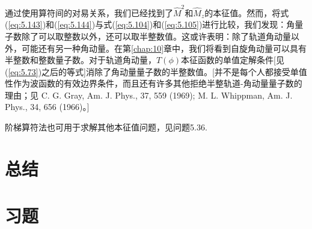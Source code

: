     通过使用算符间的对易关系，我们已经找到了$\hat{M}^2$和$\hat{M}_z$的本征值。然而，将式(\ref{eq:5.143})和(\ref{eq:5.144})与式(\ref{eq:5.104})和(\ref{eq:5.105})进行比较，我们发现：角量子数除了可以取整数以外，还可以取半整数值。这或许表明：除了轨道角动量以外，可能还有另一种角动量。在第\ref{chap:10}章中，我们将看到自旋角动量可以具有半整数和整数量子数。对于轨道角动量，$T\left(\phi\right)$本征函数的单值定解条件[见(\ref{eq:5.73})之后的等式]消除了角动量量子数的半整数值。[并不是每个人都接受单值性作为波函数的有效边界条件，而且还有许多其他拒绝半整轨道-角动量量子数的理由；见 C. G. Gray, Am. J. Phys., 37, 559 (1969); M. L. Whippman, Am. J. Phys., 34, 656 (1966)。]

    阶梯算符法也可用于求解其他本征值问题，见问题5.36.


\section*{总结}

\section*{习题}
